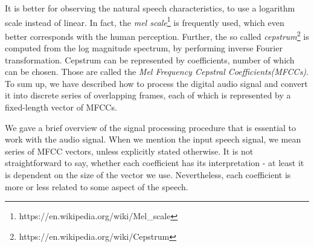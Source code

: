 \par
It is better for observing the natural speech characteristics, to use a logarithm scale instead of linear.
In fact, the \textit{mel scale}\footnote{https://en.wikipedia.org/wiki/Mel\_scale} is frequently used, which even better corresponds with the human perception.
Further, the so called \textit{cepstrum}\footnote{https://en.wikipedia.org/wiki/Cepstrum} is computed from the log magnitude spectrum, by performing inverse Fourier transformation.
Cepstrum can be represented by coefficients, number of which can be chosen.
Those are called the \textit{Mel Frequency Cepstral Coefficients(MFCCs)}.
To sum up, we have described how to process the digital audio signal and convert it into discrete series of overlapping frames, each of which is represented by a fixed-length vector of MFCCs.
\par
We gave a brief overview of the signal processing procedure that is essential to work with the audio signal.
When we mention the input speech signal, we mean series of MFCC vectors, unless explicitly stated otherwise.
It is not straightforward to say, whether each coefficient has its interpretation - at least it is dependent on the size of the vector we use.
Nevertheless, each coefficient is more or less related to some aspect of the speech.
